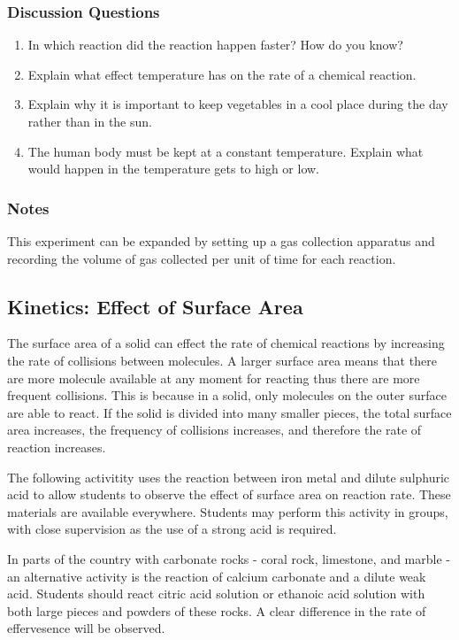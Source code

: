 \subsubsection*{Discussion Questions}
\begin{enumerate}
\item{In which reaction did the reaction happen faster? How do you know?}
\item{Explain what effect temperature has on the rate of a chemical reaction.}
\item{Explain why it is important to keep vegetables in a cool place during the day rather than in the sun.}
\item{The human body must be kept at a constant temperature. Explain what would happen in the temperature gets to high or low.}
\end{enumerate}

\subsubsection*{Notes}
This experiment can be expanded by setting up a gas collection apparatus and recording the volume of gas collected per unit of time for each reaction.

\subsection{Kinetics: Effect of Surface Area}

The surface area of a solid can effect the rate of chemical reactions by increasing the rate of collisions between molecules. A larger surface area means that there are more molecule available at any moment for reacting thus there are more frequent collisions. This is because in a solid, only molecules on the outer surface are able to react. If the solid is divided into many smaller pieces, the total surface area increases, the frequency of collisions increases, and therefore the rate of reaction increases.

The following activitity uses the reaction between iron metal and dilute sulphuric acid to allow students to observe the effect of surface area on reaction rate. These materials are available everywhere. Students may perform this activity in groups, with close supervision as the use of a strong acid is required.

In parts of the country with carbonate rocks - coral rock, limestone, and marble - an alternative activity is the reaction of calcium carbonate and a dilute weak acid. Students should react citric acid solution or ethanoic acid solution with both large pieces and powders of these rocks. A clear difference in the rate of effervesence will be observed.

